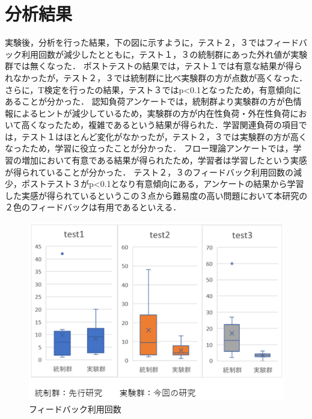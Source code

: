 \section{分析結果}
実験後，分析を行った結果，下の図に示すように，テスト２，３ではフィードバック利用回数が減少したとともに，テスト１，３の統制群にあった外れ値が実験群では無くなった．
ポストテストの結果では，テスト１では有意な結果が得られなかったが，テスト２，３では統制群に比べ実験群の方が点数が高くなった．さらに，T検定を行ったの結果，テスト３ではp<0.1となったため，有意傾向にあることが分かった．
認知負荷アンケートでは，統制群より実験群の方が色情報によるヒントが減少しているため，実験群の方が内在性負荷・外在性負荷において高くなったため，複雑であるという結果が得られた．学習関連負荷の項目では，テスト１はほとんど変化がなかったが，テスト２，３では実験群の方が高くなったため，学習に役立ったことが分かった．
フロー理論アンケートでは，学習の増加において有意である結果が得られたため，学習者は学習したという実感が得られていることが分かった．
テスト２，３のフィードバック利用回数の減少，ポストテスト３がp<0.1となり有意傾向にある，アンケートの結果から学習した実感が得られているというこの３点から難易度の高い問題において本研究の２色のフィードバックは有用であるといえる．

\begin{figure}[tb]
	\includegraphics[width=0.9\linewidth]{tex1.png}
	\centering
	\caption{フィードバック利用回数}
	\label{fig1}
\end{figure}

